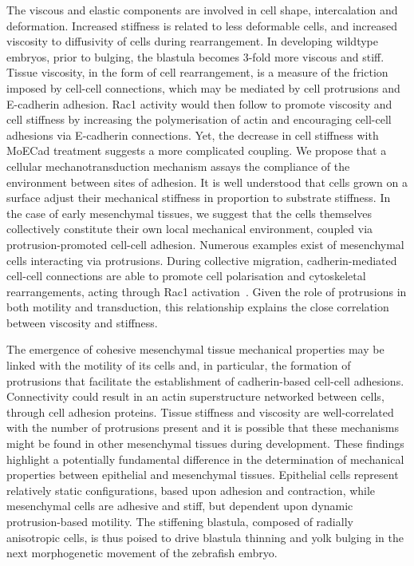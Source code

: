 The viscous and elastic components are involved in cell shape, intercalation and deformation.
Increased stiffness is related to less deformable cells, and increased viscosity to diffusivity of cells during rearrangement.
In developing wildtype embryos, prior to bulging, the blastula becomes 3-fold more viscous and stiff.
Tissue viscosity, in the form of cell rearrangement, is a measure of the friction imposed by cell-cell connections, which may be mediated by cell protrusions and
E-cadherin adhesion.
\gls{Rac1} activity would then follow to promote viscosity and cell stiffness by increasing the polymerisation of actin and encouraging cell-cell adhesions via E-cadherin connections.
Yet, the decrease in cell stiffness with MoECad treatment suggests a more complicated coupling. %
We propose that a cellular mechanotransduction mechanism assays the compliance of the environment between sites of adhesion.
It is well understood that cells grown on a surface adjust their mechanical stiffness in proportion to substrate stiffness. %
In the case of early mesenchymal tissues, we suggest that the cells themselves collectively constitute their own local mechanical environment, coupled via protrusion-promoted cell-cell adhesion.
Numerous examples exist of mesenchymal cells interacting via protrusions.
During collective migration, cadherin-mediated cell-cell connections are able to promote cell polarisation and cytoskeletal rearrangements, acting through \gls{Rac1} activation~\cite{34}.
Given the role of protrusions in both motility and transduction, this relationship explains the close correlation between viscosity and stiffness.

The emergence of cohesive mesenchymal tissue mechanical properties may be linked with the motility of its cells and, in particular, the formation of protrusions that facilitate the establishment of cadherin-based cell-cell adhesions.
Connectivity could result in an actin superstructure networked between cells, through cell adhesion proteins.
Tissue stiffness and viscosity are well-correlated with the number of protrusions present and it is possible that these mechanisms might be found in other mesenchymal tissues during development. %
These findings highlight a potentially fundamental difference in the determination of mechanical properties between epithelial and mesenchymal tissues.
Epithelial cells represent relatively static configurations, based upon adhesion and contraction, while mesenchymal cells are adhesive and stiff, but dependent upon dynamic protrusion-based motility.
The stiffening blastula, composed of radially anisotropic cells, is thus poised to drive blastula thinning and yolk bulging in the next morphogenetic movement of the zebrafish embryo.

